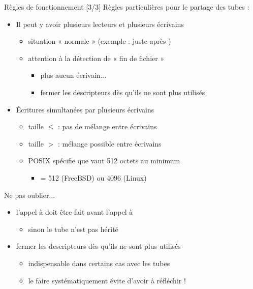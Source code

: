 \begin {frame} {Règles de fonctionnement [3/3]}
    Règles particulières pour le partage des tubes :

    \begin {itemize}
	\item Il peut y avoir plusieurs lecteurs et plusieurs écrivains
	    \begin {itemize}
		\item situation « normale » (exemple : juste après )
		\item attention à la détection de « fin de fichier »
		    \begin {itemize}
			\item plus aucun écrivain...
			\item \implique fermer les descripteurs dès
			    qu'ils ne sont plus utilisés
		    \end {itemize}
	    \end {itemize}

	\item Écritures simultanées par plusieurs écrivains
	    \begin {itemize}
		\item taille $\leq$  : pas de mélange
		    entre écrivains
		\item taille $>$  : mélange possible
		    entre écrivains
		\item POSIX spécifie que  vaut 512
		    octets au minimum
		    \begin {itemize}
			\item {} = 512 (FreeBSD) ou 4096 (Linux)
		    \end {itemize}
	    \end {itemize}

    \end {itemize}
\end {frame}

\begin {frame} {Ne pas oublier...}
    \begin {block} {}

    \begin {itemize}
	\item l'appel à  doit être fait \alert {avant}
	    l'appel à 
	    \begin {itemize}
		\item sinon le tube n'est pas hérité
	    \end {itemize}
	\item \alert {fermer} les descripteurs dès qu'ils ne sont
	    plus utilisés
	    \begin {itemize}
		\item indispensable dans certains cas avec les tubes
		\item \implique le faire systématiquement évite d'avoir
		    à réfléchir !
	    \end {itemize}
    \end {itemize}
    \end {block}
\end {frame}

